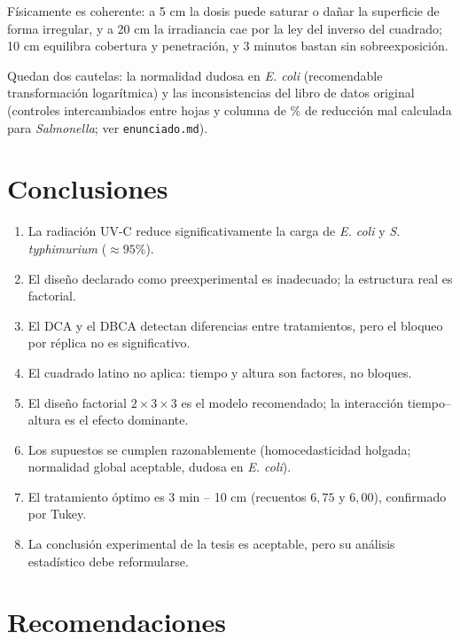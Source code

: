 \documentclass[12pt,a4paper]{article}
\begin{document}
Físicamente es coherente: a 5 cm la dosis puede saturar o dañar la superficie de forma irregular, y a 20 cm la irradiancia cae por la ley del inverso del cuadrado; 10 cm equilibra cobertura y penetración, y 3 minutos bastan sin sobreexposición.

Quedan dos cautelas: la normalidad dudosa en \textit{E. coli} (recomendable transformación logarítmica) y las inconsistencias del libro de datos original (controles intercambiados entre hojas y columna de \% de reducción mal calculada para \textit{Salmonella}; ver \texttt{enunciado.md}).

\section{Conclusiones}

\begin{enumerate}
    \item La radiación UV-C reduce significativamente la carga de \textit{E. coli} y \textit{S. typhimurium} ($\approx 95\%$).
    \item El diseño declarado como preexperimental es inadecuado; la estructura real es factorial.
    \item El DCA y el DBCA detectan diferencias entre tratamientos, pero el bloqueo por réplica no es significativo.
    \item El cuadrado latino no aplica: tiempo y altura son factores, no bloques.
    \item El diseño factorial $2\times3\times3$ es el modelo recomendado; la interacción tiempo--altura es el efecto dominante.
    \item Los supuestos se cumplen razonablemente (homocedasticidad holgada; normalidad global aceptable, dudosa en \textit{E. coli}).
    \item El tratamiento óptimo es 3 min -- 10 cm (recuentos $6{,}75$ y $6{,}00$), confirmado por Tukey.
    \item La conclusión experimental de la tesis es aceptable, pero su análisis estadístico debe reformularse.
\end{enumerate}

\section{Recomendaciones}
\end{document}
